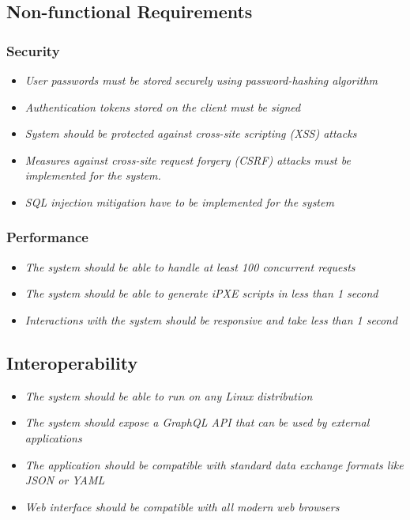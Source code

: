 \documentclass[../main.tex]{subfiles}
\begin{document}
\subsection{Non-functional Requirements}

\subsubsection{Security}
\label{req-nf:security}

\begin{itemize}
  \item \emph{User passwords must be stored securely using password-hashing algorithm}
  \item \emph{Authentication tokens stored on the client must be signed}
  \item \emph{System should be protected against cross-site scripting (XSS) attacks}
  \item \emph{Measures against cross-site request forgery (CSRF) attacks must be implemented for the system.}
  \item \emph{SQL injection mitigation have to be implemented for the system}
\end{itemize}

\subsubsection{Performance}
\label{req-nf:performance}

\begin{itemize}
  \item \emph{The system should be able to handle at least 100 concurrent requests}
  \item \emph{The system should be able to generate iPXE scripts in less than 1 second}
  \item \emph{Interactions with the system should be responsive and take less than 1 second}
\end{itemize}

\subsection{Interoperability}
\label{req-nf:interoperability}

\begin{itemize}
  \item \emph{The system should be able to run on any Linux distribution}
  \item \emph{The system should expose a GraphQL API that can be used by external applications}
  \item \emph{The application should be compatible with standard data exchange formats like JSON or YAML}
  \item \emph{Web interface should be compatible with all modern web browsers}
\end{itemize}
\end{document}
